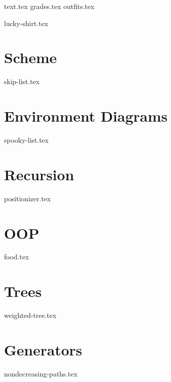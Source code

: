 \documentclass{exam}
\begin{document}
{text.tex}
{grades.tex}
{outfits.tex}

\begin{questions}
{lucky-shirt.tex}
\end{questions}

\newpage
\section{Scheme}
\begin{questions}
{skip-list.tex}
\end{questions}


\section{Environment Diagrams}
\begin{questions}
{spooky-list.tex}
\end{questions}
\newpage

\section{Recursion}
\begin{questions}
{positionizer.tex}
\end{questions}
\newpage

\section{OOP}
\begin{questions}
{food.tex}
\end{questions}
\newpage

\section{Trees}
\begin{questions}
{weighted-tree.tex}
\end{questions}
\newpage

\section{Generators}
\begin{questions}
{nondecreasing-paths.tex}
\end{questions}
\newpage
\end{document}
